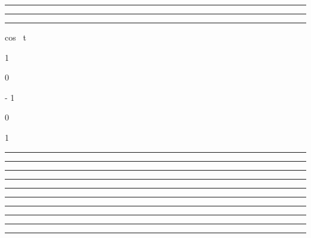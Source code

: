 \documentclass[]{article}
\begin{document}
\begin{center}\rule{3in}{0.4pt}\end{center}

\begin{center}\rule{3in}{0.4pt}\end{center}

\begin{center}\rule{3in}{0.4pt}\end{center}

 cos~ t

1

\searrow

0

\searrow

- 1

\nearrow

0

\nearrow

1

\begin{center}\rule{3in}{0.4pt}\end{center}

\begin{center}\rule{3in}{0.4pt}\end{center}

\begin{center}\rule{3in}{0.4pt}\end{center}

\begin{center}\rule{3in}{0.4pt}\end{center}

\begin{center}\rule{3in}{0.4pt}\end{center}

\begin{center}\rule{3in}{0.4pt}\end{center}

\begin{center}\rule{3in}{0.4pt}\end{center}

\begin{center}\rule{3in}{0.4pt}\end{center}

\begin{center}\rule{3in}{0.4pt}\end{center}

\begin{center}\rule{3in}{0.4pt}\end{center}
\end{document}
